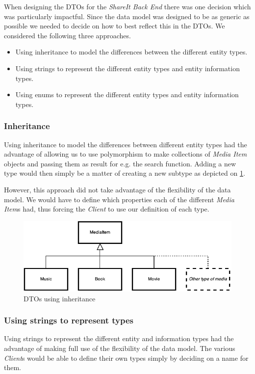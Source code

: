 \documentclass[../report.tex]{subfiles}
\begin{document}
When designing the DTOs for the \textit{ShareIt Back End} there was one decision which was particularly impactful. Since the data model was designed to be as generic as possible we needed to decide on how to best reflect this in the DTOs. We considered the following three approaches.
\begin{itemize}
\item Using inheritance to model the differences between the different entity types.
\item Using strings to represent the different entity types and entity information types.
\item Using enums to represent the different entity types and entity information types.
\end{itemize}

\subsubsection{Inheritance}
Using inheritance to model the differences between different entity types had the advantage of allowing us to use polymorphism to make collections of \textit{Media Item} objects and passing them as result for e.g. the search function. Adding a new type would then simply be a matter of creating a new subtype as depicted on \ref{fig:dto_inheritance}.
 
However, this approach did not take advantage of the flexibility of the data model. We would have to define which properties each of the different \textit{Media Item}s had, thus forcing the \textit{Client} to use our definition of each type.

\begin{figure}[!h]
\label{fig:dto_inheritance}
\centering
\includegraphics[scale=0.7]{../img/DTOInheritance.pdf}
\caption{DTOs using inheritance}
\end{figure}

\subsubsection{Using strings to represent types}
Using strings to represent the different entity and information types had the advantage of making full use of the flexibility of the data model. The various \textit{Client}s would be able to define their own types simply by deciding on a name for them. 
\end{document}

